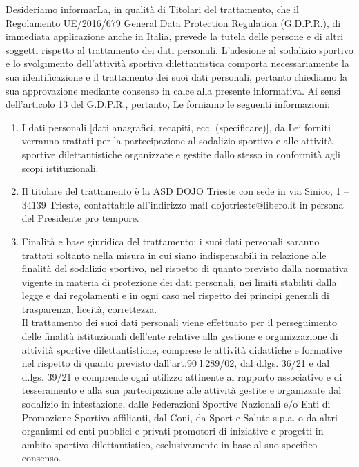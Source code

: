 \documentclass{djtsmod}
\begin{document}
	\newpage
	
	\fontsize{7pt}{10pt}\selectfont
	Desideriamo informarLa, in qualità di Titolari del trattamento, che il Regolamento UE/2016/679 General Data Protection Regulation (G.D.P.R.), di immediata applicazione anche in Italia, prevede la tutela delle persone e di altri soggetti rispetto al trattamento dei dati personali.
	L'adesione al sodalizio sportivo e lo svolgimento dell'attività sportiva dilettantistica comporta necessariamente la sua identificazione e il trattamento dei suoi dati personali, pertanto chiediamo la sua approvazione mediante consenso in calce alla presente informativa.
	Ai sensi dell'articolo 13 del G.D.P.R., pertanto, Le forniamo le seguenti informazioni:
	\begin{enumerate}[wide, labelindent = 0pt, noitemsep, topsep = 0pt]
		\item I dati personali [dati anagrafici, recapiti, ecc. (specificare)], da Lei forniti verranno trattati per la partecipazione al sodalizio sportivo e alle attività sportive dilettantistiche organizzate e gestite dallo stesso in conformità agli scopi istituzionali.
		\item Il titolare del trattamento è la ASD DOJO Trieste con sede in via Sinico, 1 – 34139 Trieste, contattabile all'indirizzo mail dojotrieste@libero.it  in persona del Presidente pro tempore.
		\item Finalità e base giuridica del trattamento: i suoi dati personali saranno trattati soltanto nella misura in cui siano indispensabili in relazione alle finalità del sodalizio sportivo, nel rispetto di quanto previsto dalla normativa vigente in materia di protezione dei dati personali, nei limiti stabiliti dalla legge e dai regolamenti e in ogni caso nel rispetto dei principi generali di trasparenza, liceità, correttezza. \\
		Il trattamento dei suoi dati personali viene effettuato  per il perseguimento delle finalità istituzionali dell'ente relative alla gestione e organizzazione di attività sportive dilettantistiche, comprese le attività didattiche e formative nel rispetto di quanto previsto dall'art.90 l.289/02, dal d.lgs. 36/21 e dal d.lgs. 39/21 e comprende ogni utilizzo attinente al rapporto associativo e di tesseramento e alla sua partecipazione alle attività gestite e organizzate dal sodalizio in intestazione, dalle Federazioni Sportive Nazionali e/o Enti di Promozione Sportiva affilianti,  dal Coni, da Sport e Salute s.p.a. o da altri organismi ed enti pubblici e privati promotori di iniziative e progetti in ambito sportivo dilettantistico, esclusivamente in base al suo specifico consenso. \\

\end{enumerate}
\end{document}
